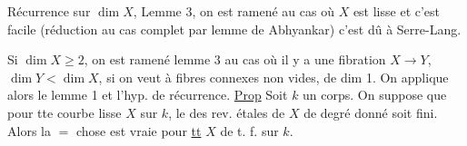 
 Récurrence sur $\dim X$,    Lemme 3, on est ramené au cas où $X$ est lisse et   c'est facile (réduction au cas complet par lemme de Abhyankar)  c'est dû à  Serre-Lang. 

Si $\dim X\geq 2$, on est ramené   lemme 3 au cas où il y a une fibration  $X\longrightarrow Y$, $\dim Y<\dim X$,  si on veut à fibres  connexes non vides, de dim 1. On applique alors le lemme 1 et l'hyp. de récurrence.
\uline{Prop} Soit $k$ un corps. On suppose que pour tte  courbe  lisse $X$ sur $k$, le  des rev. étales de $X$ de degré donné soit fini. Alors la $=$ chose est vraie pour \uline{tt} $X$ de t. f. sur $k$.
